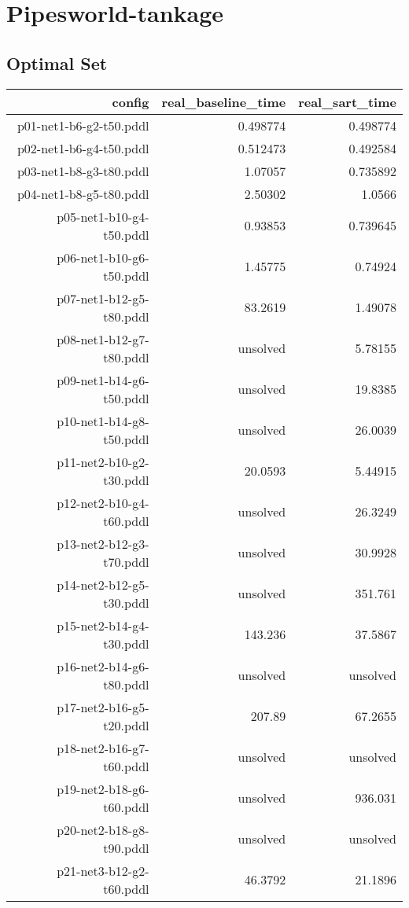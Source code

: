 \documentclass{article}
\begin{document}
                \newpage \section{Pipesworld-tankage}
                    \subsection*{Optimal Set}
                    
                            \begin{center}
                            \scriptsize
                            \begin{tabular}{r|r|r}
                            config & real\_baseline\_time & real\_sart\_time\\\midrule
                             p01-net1-b6-g2-t50.pddl&0.498774&0.498774\\
 p02-net1-b6-g4-t50.pddl&0.512473&0.492584\\
 p03-net1-b8-g3-t80.pddl&1.07057&0.735892\\
 p04-net1-b8-g5-t80.pddl&2.50302&1.0566\\
 p05-net1-b10-g4-t50.pddl&0.93853&0.739645\\
 p06-net1-b10-g6-t50.pddl&1.45775&0.74924\\
 p07-net1-b12-g5-t80.pddl&83.2619&1.49078\\
 p08-net1-b12-g7-t80.pddl&unsolved&5.78155\\
 p09-net1-b14-g6-t50.pddl&unsolved&19.8385\\
 p10-net1-b14-g8-t50.pddl&unsolved&26.0039\\
 p11-net2-b10-g2-t30.pddl&20.0593&5.44915\\
 p12-net2-b10-g4-t60.pddl&unsolved&26.3249\\
 p13-net2-b12-g3-t70.pddl&unsolved&30.9928\\
 p14-net2-b12-g5-t30.pddl&unsolved&351.761\\
 p15-net2-b14-g4-t30.pddl&143.236&37.5867\\
 p16-net2-b14-g6-t80.pddl&unsolved&unsolved\\
 p17-net2-b16-g5-t20.pddl&207.89&67.2655\\
 p18-net2-b16-g7-t60.pddl&unsolved&unsolved\\
 p19-net2-b18-g6-t60.pddl&unsolved&936.031\\
 p20-net2-b18-g8-t90.pddl&unsolved&unsolved\\
 p21-net3-b12-g2-t60.pddl&46.3792&21.1896\\

\end{tabular}
\end{center}
\end{document}
